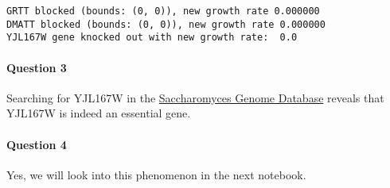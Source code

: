 \documentclass[11pt]{article}
\begin{document}
    \begin{Verbatim}[commandchars=\\\{\}]
GRTT blocked (bounds: (0, 0)), new growth rate 0.000000
DMATT blocked (bounds: (0, 0)), new growth rate 0.000000
YJL167W gene knocked out with new growth rate:  0.0
    \end{Verbatim}

    \hypertarget{question-3}{%
\paragraph{Question 3}\label{question-3}}

Searching for YJL167W in the
\href{https://www.yeastgenome.org/locus/S000003703}{Saccharomyces Genome
Database} reveals that YJL167W is indeed an essential gene.

    \hypertarget{question-4}{%
\paragraph{Question 4}\label{question-4}}

Yes, we will look into this phenomenon in the next notebook.


    
    
    
\end{document}
